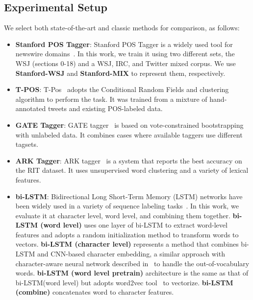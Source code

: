 \documentclass[11pt,letterpaper]{article}
\begin{document}
\subsection{Experimental Setup}

We select both state-of-the-art and classic methods for comparison, as follows:
\begin{itemize}
  \item \textbf{Stanford POS Tagger}: Stanford POS Tagger is a widely used tool for newswire domains~\cite{toutanova2003feature}. In this work, we train it using two different sets, the WSJ (sections 0-18) and a WSJ, IRC, and Twitter mixed corpus. We use \textbf{Stanford-WSJ} and \textbf{Stanford-MIX} to represent them, respectively.  
  
  \item \textbf{T-POS}: T-Pos~\cite{ritter2011named} adopts the Conditional Random Fields and clustering algorithm to perform the task. It was trained from a mixture of hand-annotated tweets and existing POS-labeled data. 
  
  \item \textbf{GATE Tagger}: GATE tagger~\cite{derczynski2013twitter} is based on vote-constrained bootstrapping with unlabeled data. It combines cases where available taggers use different tagsets.
  
  \item \textbf{ARK Tagger}: ARK tagger~\cite{owoputi2013improved} is a system that reports the best accuracy on the RIT dataset. It uses unsupervised word clustering and a variety of lexical features.

  \item \textbf{bi-LSTM}: Bidirectional Long Short-Term Memory (LSTM) networks have been widely used in a variety of sequence labeling tasks~\cite{graves2005framewise}. In this work, we evaluate it at character level, word level, and combining them together. \textbf{bi-LSTM (word level)} uses one layer of bi-LSTM to extract word-level features and adopts a random initialization method to transform words to vectors. \textbf{bi-LSTM (character level)} represents a method that combines bi-LSTM and CNN-based character embedding, a similar approach with character-aware neural network described in~\cite{kim2015character} to handle the out-of-vocabulary words. \textbf{bi-LSTM (word level pretrain)} architecture is the same as that of bi-LSTM(word level) but adopts word2vec tool~\cite{mikolov2013distributed} to vectorize. \textbf{bi-LSTM (combine)} concatenates word to character features.
\end{itemize}
\end{document}

